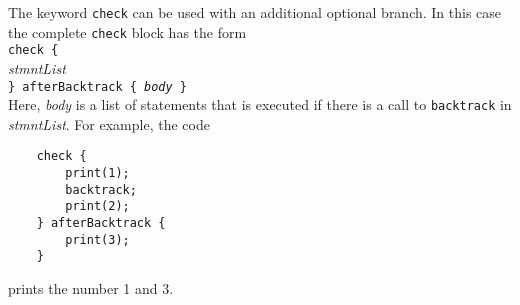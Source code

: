 The keyword \texttt{check} can be used with an additional optional branch.  In this case the
complete \texttt{check} block has the form
\\[0.2cm]
\hspace*{1.3cm}
\texttt{check \{} 
\\
\hspace*{1.8cm}
\textsl{stmntList}
\\
\hspace*{1.3cm}
\texttt{\} afterBacktrack \{ \textsl{body} \}}
\\[0.2cm]
Here, \textsl{body} is a list of statements that is executed if there is a call to \texttt{backtrack} in
\textsl{stmntList}.  For example, the code
\begin{verbatim}
    check { 
        print(1); 
        backtrack; 
        print(2); 
    } afterBacktrack { 
        print(3); 
    }
\end{verbatim}
prints the number 1 and 3.




